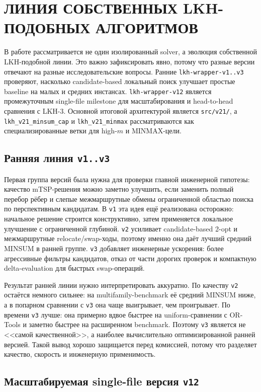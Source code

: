 \documentclass[14pt,a4paper]{extarticle}
\begin{document}
\section{ЛИНИЯ СОБСТВЕННЫХ LKH-ПОДОБНЫХ АЛГОРИТМОВ}

В работе рассматривается не один изолированный solver, а эволюция собственной LKH-подобной линии. Это важно зафиксировать явно, потому что разные версии отвечают на разные исследовательские вопросы. Ранние \texttt{lkh-wrapper-v1..v3} проверяют, насколько candidate-based локальный поиск улучшает простые baseline на малых и средних инстансах. \texttt{lkh-wrapper-v12} является промежуточным single-file milestone для масштабирования и head-to-head сравнения с LKH-3. Основной итоговой архитектурой является \texttt{src/v21/}, а \texttt{lkh\_v21\_minsum\_cap} и \texttt{lkh\_v21\_minmax} рассматриваются как специализированные ветки для high-$m$ и MINMAX-цели.

\subsection{Ранняя линия \texttt{v1..v3}}

Первая группа версий была нужна для проверки главной инженерной гипотезы: качество mTSP-решения можно заметно улучшить, если заменить полный перебор рёбер и слепые межмаршрутные обмены ограниченной областью поиска по перспективным кандидатам. В \texttt{v1} эта идея ещё реализована осторожно: начальное решение строится конструктивно, затем применяется локальное улучшение с ограниченной глубиной. \texttt{v2} усиливает candidate-based 2-opt и межмаршрутные relocate/swap-ходы, поэтому именно она даёт лучший средний MINSUM в ранней группе. \texttt{v3} добавляет инженерные ускорения: более агрессивные фильтры кандидатов, отказ от части дорогих проверок и компактную delta-evaluation для быстрых swap-операций.

Результат ранней линии нужно интерпретировать аккуратно. По качеству \texttt{v2} остаётся немного сильнее: на multifamily-benchmark её средний MINSUM ниже, а в попарном сравнении с \texttt{v3} она чаще выигрывает, чем проигрывает. По времени \texttt{v3} лучше: она примерно вдвое быстрее на uniform-сравнении с OR-Tools и заметно быстрее на расширенном benchmark. Поэтому \texttt{v3} является не <<самой качественной>>, а наиболее вычислительно оптимизированной ранней версией. Такой вывод хорошо защищается перед комиссией, потому что разделяет качество, скорость и инженерную применимость.

\subsection{Масштабируемая single-file версия \texttt{v12}}
\end{document}

